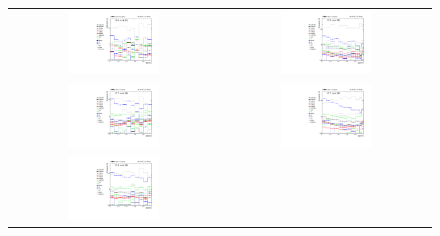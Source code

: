 \begin{figure}[tbh!]
 \begin{center}
 \begin{tabular}{cc}
  \includegraphics[width=0.45\textwidth]{figures/Part3/Systematics/sysBDT_ST_bkg_2016}&
  \includegraphics[width=0.45\textwidth]{figures/Part3/Systematics/sysBDT_TT_bkg_2016} \\
    \includegraphics[width=0.45\textwidth]{figures/Part3/Systematics/sysBDT_ST_bkg_2017}&
  \includegraphics[width=0.45\textwidth]{figures/Part3/Systematics/sysBDT_TT_bkg_2017} \\
    \includegraphics[width=0.45\textwidth]{figures/Part3/Systematics/sysBDT_ST_bkg_2018}&

\end{tabular}
\end{center}
\end{figure}
